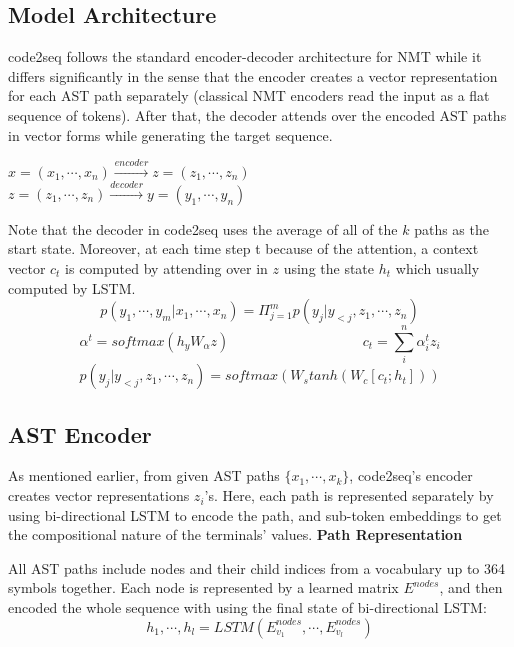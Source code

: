 \documentclass[11pt]{article}
\begin{document}
\subsection{Model Architecture}

code2seq follows the standard encoder-decoder architecture for NMT while it differs significantly in the sense that the encoder creates a vector representation for each AST path separately (classical NMT encoders read the input as a flat sequence of tokens). After that, the decoder attends over the encoded AST paths in vector forms while generating the target sequence. 
\begin{center}
    $x = (x_1, \cdots, x_n) \xrightarrow{encoder} z = (z_1, \cdots, z_n)$ \\
    $z = (z_1, \cdots, z_n) \xrightarrow{decoder} y = (y_1, \cdots, y_n)$
\end{center}
Note that the decoder in code2seq uses the average of all of the $k$ paths as the start state. Moreover, at each time step t because of the attention, a context vector $c_t$ is computed by attending over in $z$ using the state $h_t$ which usually computed by LSTM.
\begin{equation*}
    p(y_1, \cdots, y_m | x_1, \cdots, x_n) = \Pi_{j=1}^{m} p(y_j | y _{<j}, z_1, \cdots, z_n)
\end{equation*}
\begin{equation*}
    \alpha^t = softmax(h_y W_{\alpha}z) \hspace{4cm} c_t = \sum_{i}^n \alpha_{i}^t z_i
\end{equation*}
\begin{equation*}
    p(y_j | y _{<j}, z_1, \cdots, z_n) = softmax(W_s tanh(W_c[c_t;h_t]))
\end{equation*}

\subsection{AST Encoder}

As mentioned earlier, from given AST paths $\{x_1, \cdots, x_k\}$, code2seq's encoder creates vector representations $z_i$'s. Here, each path is represented separately by using bi-directional LSTM to encode the path, and sub-token embeddings to get the compositional nature of the terminals' values.
\newline
\newline
\textbf{Path Representation}

All AST paths include nodes and their child indices from a vocabulary up to 364 symbols together. Each node is represented by a learned matrix $E^{nodes}$, and then encoded the whole sequence with using the final state of bi-directional LSTM:
\begin{equation*}
    h_1, \cdots, h_l = LSTM(E_{v_1}^{nodes}, \cdots, E_{v_l}^{nodes})
\end{equation*}
\end{document}
